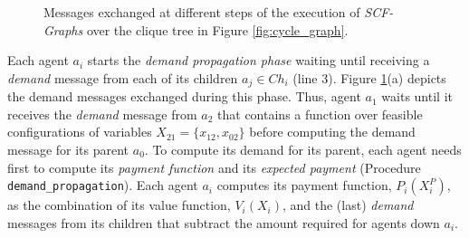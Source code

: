 \documentclass[11pt, twoside, titlepage, a4paper, openright]{report}
\begin{document}
\begin{figure}[!ht]
{}
\caption{\label{fig:execution} Messages exchanged at different steps of the
execution of \emph{SCF-Graphs} over the clique tree in Figure
\ref{fig:cycle_graph}.}
\end{figure}

\noindent Each agent $a_i$ starts the \textit{demand propagation phase} waiting until
receiving a \emph{demand} message from each of its children $a_j\in Ch_i$ (line
3).
Figure \ref{fig:execution}(a) depicts the demand messages exchanged during this
phase. Thus, agent $a_1$ waits until it receives the \emph{demand}
message from $a_2$ that contains a function over feasible configurations of 
variables $X_{21}=\{x_{12},x_{02}\}$ before computing the demand message for
its parent $a_0$. To compute its demand for its parent, each agent needs first
to compute its \textit{payment function} and its \textit{expected payment}
(Procedure \texttt{demand\_propagation}).
Each agent $a_i$ computes its payment function, $P_i(X^{P}_{i})$, as
the combination of its value function, $V_i(X_i)$, and the (last)
\emph{demand} messages from its children that subtract the amount required for agents down $a_i$.
\end{document}
